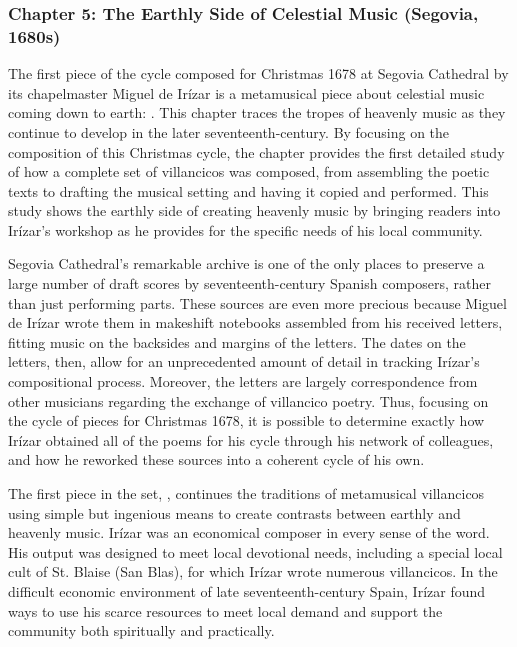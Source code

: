 \subsubsection{Chapter 5: The Earthly Side of Celestial Music (Segovia, 1680s)}

The first piece of the cycle composed for Christmas 1678 at Segovia Cathedral by
its chapelmaster Miguel de Irízar is a metamusical piece about celestial music
coming down to earth: .
This chapter traces the tropes of heavenly music as they continue to develop in
the later seventeenth-century. 
By focusing on the composition of this Christmas cycle, the chapter
provides the first detailed study of how a complete set of villancicos was
composed, from assembling the poetic texts to drafting the musical setting and
having it copied and performed.
This study shows the earthly side of creating heavenly music by bringing
readers into Irízar's workshop as he provides for the specific needs of his
local community.

Segovia Cathedral's remarkable archive is one of the only places to preserve a 
large number of draft scores by seventeenth-century Spanish composers, rather 
than just performing parts.
These sources are even more precious because Miguel de Irízar wrote them in
makeshift notebooks assembled from his received letters, fitting music on the
backsides and margins of the letters.
The dates on the letters, then, allow for an unprecedented amount of detail in
tracking Irízar's compositional process.
Moreover, the letters are largely correspondence from other musicians regarding 
the exchange of villancico poetry.
Thus, focusing on the cycle of pieces for Christmas 1678, it is possible to 
determine exactly how Irízar obtained all of the poems for his cycle through 
his network of colleagues, and how he reworked these sources into a coherent 
cycle of his own.

The first piece in the set, , continues the 
traditions of metamusical villancicos using simple but ingenious means to 
create contrasts between earthly and heavenly music.
Irízar was an economical composer in every sense of the word.
His output was designed to meet local devotional needs, including a special 
local cult of St. Blaise (San Blas), for which Irízar wrote numerous 
villancicos. 
In the difficult economic environment of late seventeenth-century Spain, Irízar 
found ways to use his scarce resources to meet local demand and support the 
community both spiritually and practically.


